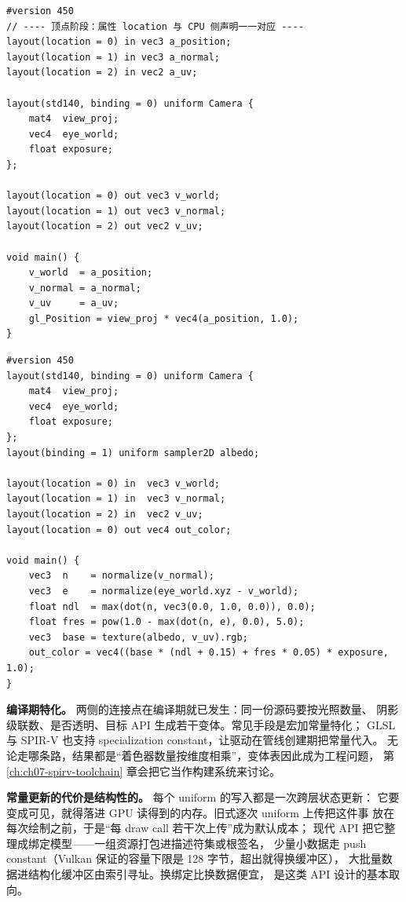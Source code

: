 \documentclass[12pt,a4paper,fontset=fandol]{ctexbook}
\newcommand{\Lang}[1]{\textsf{#1}}
\newcommand{\DomGPU}{\Lang{GPU}}
\newcommand{\GSL}{\Lang{GLSL}}
\newcommand{\SPIV}{\Lang{SPIR-V}}
\begin{document}
\begin{lstlisting}[style=glslstyle,caption={与上例逐字段呼应的最小顶点与片元着色器},label={lst:ch01-glsl-pair}]
#version 450
// ---- 顶点阶段：属性 location 与 CPU 侧声明一一对应 ----
layout(location = 0) in vec3 a_position;
layout(location = 1) in vec3 a_normal;
layout(location = 2) in vec2 a_uv;

layout(std140, binding = 0) uniform Camera {
    mat4  view_proj;
    vec4  eye_world;
    float exposure;
};

layout(location = 0) out vec3 v_world;
layout(location = 1) out vec3 v_normal;
layout(location = 2) out vec2 v_uv;

void main() {
    v_world  = a_position;
    v_normal = a_normal;
    v_uv     = a_uv;
    gl_Position = view_proj * vec4(a_position, 1.0);
}
\end{lstlisting}

\begin{lstlisting}[style=glslstyle,caption={同一个常量块在片元侧必须原样再声明一遍},label={lst:ch01-glsl-fs}]
#version 450
layout(std140, binding = 0) uniform Camera {
    mat4  view_proj;
    vec4  eye_world;
    float exposure;
};
layout(binding = 1) uniform sampler2D albedo;

layout(location = 0) in  vec3 v_world;
layout(location = 1) in  vec3 v_normal;
layout(location = 2) in  vec2 v_uv;
layout(location = 0) out vec4 out_color;

void main() {
    vec3  n    = normalize(v_normal);
    vec3  e    = normalize(eye_world.xyz - v_world);
    float ndl  = max(dot(n, vec3(0.0, 1.0, 0.0)), 0.0);
    float fres = pow(1.0 - max(dot(n, e), 0.0), 5.0);
    vec3  base = texture(albedo, v_uv).rgb;
    out_color = vec4((base * (ndl + 0.15) + fres * 0.05) * exposure, 1.0);
}
\end{lstlisting}

\textbf{编译期特化。} 两侧的连接点在编译期就已发生：同一份源码要按光照数量、
阴影级联数、是否透明、目标 API 生成若干变体。常见手段是宏加常量特化；
\GSL{} 与 \SPIV{} 也支持 specialization constant，让驱动在管线创建期把常量代入。
无论走哪条路，结果都是``着色器数量按维度相乘''，变体表因此成为工程问题，
第 \ref{ch:ch07-spirv-toolchain} 章会把它当作构建系统来讨论。

\textbf{常量更新的代价是结构性的。} 每个 uniform 的写入都是一次跨层状态更新：
它要变成可见，就得落进 \DomGPU{} 读得到的内存。旧式逐次 uniform 上传把这件事
放在每次绘制之前，于是``每 draw call 若干次上传''成为默认成本；
现代 API 把它整理成绑定模型——一组资源打包进描述符集或根签名，
少量小数据走 push constant（Vulkan 保证的容量下限是 128 字节，超出就得换缓冲区），
大批量数据进结构化缓冲区由索引寻址。换绑定比换数据便宜，
是这类 API 设计的基本取向。
\end{document}
